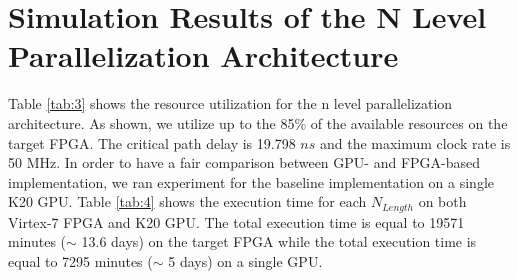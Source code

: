 \section{Simulation Results of the N Level Parallelization Architecture} \label{sec:simNlevel}
Table \ref{tab:3} shows the resource utilization for the n level parallelization architecture. As shown, we utilize up to the 85\% of the available resources on the target FPGA. The critical path delay is 19.798 $ns$ and the maximum clock rate is 50 MHz. In order to have a fair comparison between GPU- and FPGA-based implementation, we ran experiment for the baseline implementation \cite{b9} on a single K20 GPU. Table \ref{tab:4} shows the execution time for each $N_{Length}$ on both Virtex-7 FPGA and K20 GPU. The total execution time is equal to 19571 minutes ($\sim$ 13.6 days) on the target FPGA while the total execution time is equal to 7295 minutes ($\sim$ 5 days) on a single GPU.

